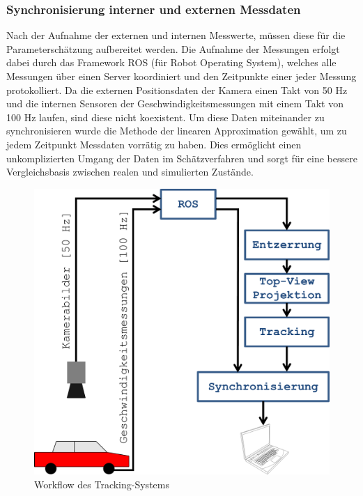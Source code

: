 \subsubsection{Synchronisierung interner und externen Messdaten}
Nach der Aufnahme der externen und internen Messwerte, müssen diese für die Parameterschätzung aufbereitet werden. Die Aufnahme der Messungen erfolgt dabei durch das Framework ROS (für Robot Operating System), welches alle Messungen über einen Server koordiniert und den Zeitpunkte einer jeder Messung protokolliert. Da die externen Positionsdaten der Kamera einen Takt von 50 Hz und die internen Sensoren der Geschwindigkeitsmessungen mit einem Takt von 100 Hz laufen, sind diese nicht koexistent. Um diese Daten miteinander zu synchronisieren wurde die Methode der linearen Approximation gewählt, um zu jedem Zeitpunkt Messdaten vorrätig zu haben. Dies ermöglicht einen unkomplizierten Umgang der Daten im Schätzverfahren und sorgt für eine bessere Vergleichsbasis zwischen realen und simulierten Zustände. \\
\begin{figure}[H]
\centering
\includegraphics[scale=0.65]{Bilder/Workflow.png} 
\caption{Workflow des Tracking-Systems}
\label{fig:Track}
\end{figure}
